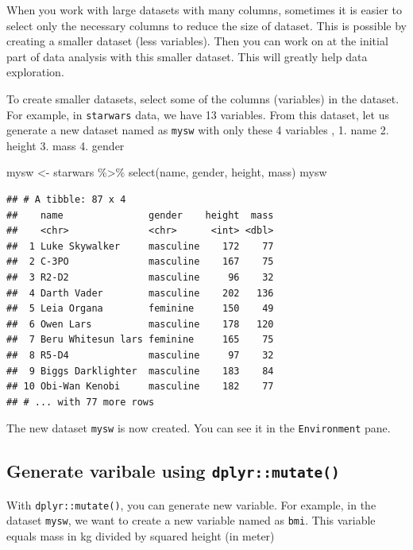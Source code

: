 \documentclass[
]{book}
\makeatletter
\newenvironment{Shaded}{\begin{snugshade}}{\end{snugshade}}
\newcommand{\FunctionTok}[1]{\textcolor[rgb]{0,0,0}{#1}}
\newcommand{\NormalTok}[1]{#1}
\newcommand{\OtherTok}[1]{\textcolor[rgb]{0.37,0.37,0.37}{#1}}
\newcommand{\SpecialCharTok}[1]{\textcolor[rgb]{0,0,0}{#1}}
\newenvironment{kframe}{%
\medskip{}
\setlength{\fboxsep}{.8em}
 \def\at@end@of@kframe{}%
 \ifinner\ifhmode%
  \def\at@end@of@kframe{\end{minipage}}%
  \begin{minipage}{\columnwidth}%
 \fi\fi%
 \def\FrameCommand##1{\hskip\@totalleftmargin \hskip-\fboxsep
 \colorbox{shadecolor}{##1}\hskip-\fboxsep
     \hskip-\linewidth \hskip-\@totalleftmargin \hskip\columnwidth}%
 \MakeFramed {\advance\hsize-\width
   \@totalleftmargin\z@ \linewidth\hsize
   \@setminipage}}%
 {\par\unskip\endMakeFramed%
 \at@end@of@kframe}
\renewenvironment{Shaded}{\begin{kframe}}{\end{kframe}}
\makeatother
\begin{document}
When you work with large datasets with many columns, sometimes it is easier to select only the necessary columns to reduce the size of dataset. This is possible by creating a smaller dataset (less variables). Then you can work on at the initial part of data analysis with this smaller dataset. This will greatly help data exploration.

To create smaller datasets, select some of the columns (variables) in the dataset. For example, in \texttt{starwars} data, we have 13 variables. From this dataset, let us generate a new dataset named as \texttt{mysw} with only these 4 variables ,
1. name
2. height
3. mass
4. gender

\begin{Shaded}
\begin{Highlighting}[]
\NormalTok{mysw }\OtherTok{\textless{}{-}}\NormalTok{ starwars }\SpecialCharTok{\%\textgreater{}\%} \FunctionTok{select}\NormalTok{(name, gender, height, mass)}
\NormalTok{mysw}
\end{Highlighting}
\end{Shaded}

\begin{verbatim}
## # A tibble: 87 x 4
##    name               gender    height  mass
##    <chr>              <chr>      <int> <dbl>
##  1 Luke Skywalker     masculine    172    77
##  2 C-3PO              masculine    167    75
##  3 R2-D2              masculine     96    32
##  4 Darth Vader        masculine    202   136
##  5 Leia Organa        feminine     150    49
##  6 Owen Lars          masculine    178   120
##  7 Beru Whitesun lars feminine     165    75
##  8 R5-D4              masculine     97    32
##  9 Biggs Darklighter  masculine    183    84
## 10 Obi-Wan Kenobi     masculine    182    77
## # ... with 77 more rows
\end{verbatim}

The new dataset \texttt{mysw} is now created. You can see it in the \texttt{Environment} pane.

\hypertarget{generate-varibale-using-dplyrmutate}{%
\subsection{\texorpdfstring{Generate varibale using \texttt{dplyr::mutate()}}{Generate varibale using dplyr::mutate()}}\label{generate-varibale-using-dplyrmutate}}

With \texttt{dplyr::mutate()}, you can generate new variable. For example, in the dataset \texttt{mysw}, we want to create a new variable named as \texttt{bmi}. This variable equals mass in kg divided by squared height (in meter)
\end{document}
